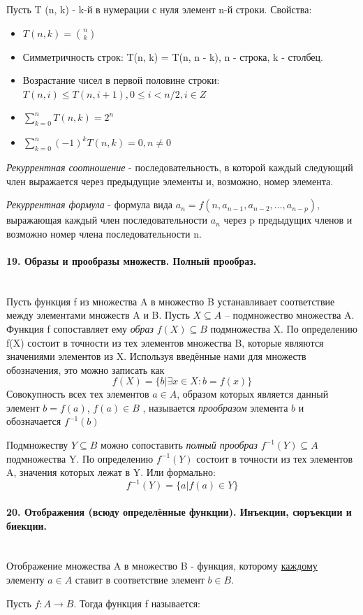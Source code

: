 \documentclass[a4paper, 12pt]{article}
\newcommand{\parag}[1]{\paragraph{#1}\mbox{}\\}
\begin{document}
Пусть T (n, k) - k-й в нумерации с нуля элемент n-й строки. Свойства:
\begin{itemize}
    \item $T(n, k) = {n \choose k}$
    \item Симметричность строк: T(n, k) = T(n, n - k), n - строка, k - столбец.
    \item Возрастание чисел в первой половине строки: $T(n, i) \leqslant T (n, i + 1), 0 \leqslant i < n/2, i \in Z$
    \item $\sum_{k=0}^{n} T(n, k) = 2^n$
    \item $\sum_{k=0}^{n} (-1)^k T(n, k) = 0, n \neq 0$
\end{itemize}

\noindent
\textit{Рекуррентная соотношение} - последовательность, в которой каждый следующий член выражается через предыдущие элементы и, возможно, номер элемента.

\noindent
\textit{Рекуррентная формула} - формула вида $a_{n}=f(n,a_{n-1},a_{n-2},\dots ,a_{n-p})$, выражающая каждый член последовательности $a_{n}$ через p предыдущих членов и возможно номер члена последовательности n.

\parag{19. Образы и прообразы множеств. Полный прообраз.}
Пусть функция f из множества A в множество B устанавливает соответствие между элементами множеств A и B. Пусть $X \subseteq A$ – подмножество множества A. Функция f сопоставляет ему \textit{образ} $f(X) \subseteq B$ подмножества X. По определению f(X) состоит в точности из тех
элементов множества B, которые являются значениями элементов из X. Используя введённые нами для множеств обозначения, это можно записать как
\[
    f(X) = \{ b | \exists x \in X: b = f(x) \}
\]
Совокупность всех тех элементов $a \in A$, образом которых является данный элемент $b = f(a)$, $f(a) \in B$ , называется \textit{прообразом} элемента $b$ и обозначается $f^{-1}(b)$

\noindent
Подмножеству $Y \subseteq B$ можно сопоставить \textit{полный прообраз} $f^{-1}(Y) \subseteq A $ подмножества Y. По определению $f^{-1}(Y)$ состоит в точности из тех элементов A, значения которых лежат в Y. Или формально:
\[
    f^{-1}(Y) = \{a | f(a) \in Y\}
\]

\parag{20. Отображения (всюду определённые функции). Инъекции, сюръекции и биекции.}
Отображение множества A в множество B - функция, которому \underline{каждому} элементу $a \in A$ ставит в соответствие элемент $b \in B$.

\noindent
Пусть $f: A \to B$. Тогда функция f называется:
\end{document}
